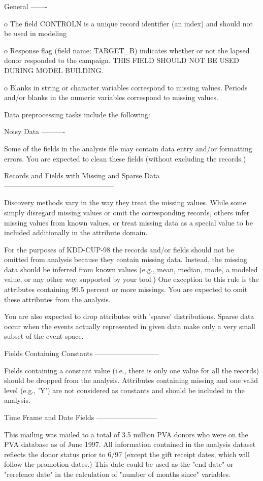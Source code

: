 \documentclass[
  11pt,
  a4paper,
  DIV=12,captions=tableheading,oneside,titlepage]{scrbook}
\let\oldverbatim\verbatim
\let\endoldverbatim\endverbatim
\renewenvironment{verbatim}{\footnotesize\oldverbatim}{\endoldverbatim}
\begin{document}
\begin{verbatim}
General 
-------

o The field CONTROLN is a unique record identifier (an index) and
should not be used in modeling

o Response flag (field name: TARGET_B) indicates whether or not the
lapsed donor responded to the campaign. THIS FIELD SHOULD NOT BE USED
DURING MODEL BUILDING.

o Blanks in string or character variables correspond to missing
values.  Periods and/or blanks in the numeric variables correspond to
missing values.

Data preprocessing tasks include the following:

Noisy Data
----------

Some of the fields in the analysis file may contain data entry and/or
formatting errors. You are expected to clean these fields (without
excluding the records.)

Records and Fields with Missing and Sparse Data
-----------------------------------------------

Discovery methods vary in the way they treat the missing values. While
some simply disregard missing values or omit the corresponding
records, others infer missing values from known values, or treat
missing data as a special value to be included additionally in the
attribute domain.

For the purposes of KDD-CUP-98 the records and/or fields should not be
omitted from analysis because they contain missing data. Instead, the
missing data should be inferred from known values (e.g., mean, median,
mode, a modeled value, or any other way supported by your tool.) One
exception to this rule is the attributes containing 99.5 percent or
more missings. You are expected to omit these attributes from the
analysis.

You are also expected to drop attributes with 'sparse'
distributions. Sparse data occur when the events actually represented
in given data make only a very small subset of the event space.

Fields Containing Constants
---------------------------

Fields containing a constant value (i.e., there is only one value for
all the records) should be dropped from the analysis. Attributes
containing missing and one valid level (e.g., 'Y') are not considered
as constants and should be included in the analysis.

Time Frame and Date Fields
--------------------------

This mailing was mailed to a total of 3.5 million PVA donors who were
on the PVA database as of June 1997. All information contained in the
analysis dataset reflects the donor status prior to 6/97 (except the
gift receipt dates, which will follow the promotion dates.) This date
could be used as the "end date" or "rerefence date" in the calculation
of "number of months since" variables.


\end{verbatim}
\end{document}
